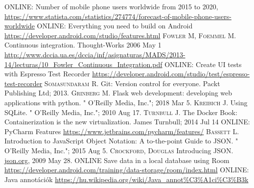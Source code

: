 \documentclass{thesis-ekf}
\theoremstyle{definition}
\theoremstyle{remark}
\begin{document}
\begin{thebibliography}{1}
 \textsc{ONLINE}: Number of mobile phone users worldwide from 2015 to 2020, \url{https://www.statista.com/statistics/274774/forecast-of-mobile-phone-users-worldwide}
 \textsc{ONLINE}: Everything you need to build on Android \url{https://developer.android.com/studio/features.html}
 \textsc{Fowler M, Foemmel M.} Continuous integration. Thought-Works 2006 May 1 \url{http://www.dccia.ua.es/dccia/inf/asignaturas/MADS/2013-14/lecturas/10_Fowler_Continuous_Integration.pdf}
 \textsc{ONLINE}: Create UI tests with Espresso Test Recorder \url{https://developer.android.com/studio/test/espresso-test-recorder}
 \textsc{Somasundaram R.} Git: Version control for everyone. Packt Publishing Ltd; 2013.
 \textsc{Grinberg M.} Flask web development: developing web applications with python. " O'Reilly Media, Inc."; 2018 Mar 5.
 \textsc{Kreibich J.} Using SQLite. " O'Reilly Media, Inc."; 2010 Aug 17.
 \textsc{Turnbull J.} The Docker Book: Containerization is the new virtualization. James Turnbull; 2014 Jul 14
 \textsc{ONLINE}: PyCharm Features \url{https://www.jetbrains.com/pycharm/features/}
 \textsc{Bassett L.} Introduction to JavaScript Object Notation: A to-the-point Guide to JSON. " O'Reilly Media, Inc."; 2015 Aug 5.
 \textsc{Crockford, Douglas} Introducing JSON. \url{json.org}, 2009 May 28.
 \textsc{ONLINE} Save data in a local database using Room \url{https://developer.android.com/training/data-storage/room/index.html}
 \textsc{ONLINE}: Java annotációk \url{https://hu.wikipedia.org/wiki/Java_annot%C3%A1ci%C3%B3k}
\end{thebibliography}
\end{document}
